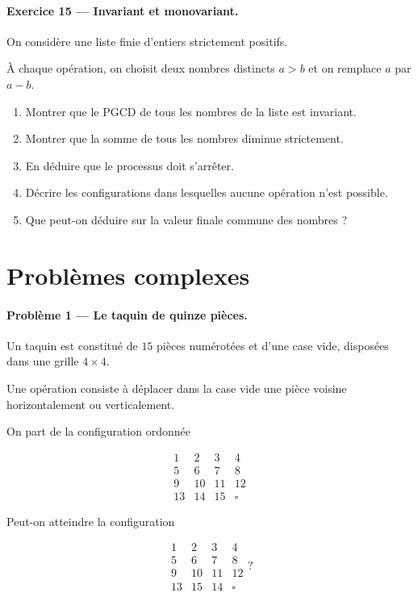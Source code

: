 \paragraph{Exercice 15 --- Invariant et monovariant.}
On considère une liste finie d'entiers strictement positifs.

À chaque opération, on choisit deux nombres distincts \(a>b\) et on remplace
\(a\) par \(a-b\).

\begin{enumerate}
    \item Montrer que le PGCD de tous les nombres de la liste est invariant.
    \item Montrer que la somme de tous les nombres diminue strictement.
    \item En déduire que le processus doit s'arrêter.
    \item Décrire les configurations dans lesquelles aucune opération n'est
    possible.
    \item Que peut-on déduire sur la valeur finale commune des nombres ?
\end{enumerate}

\section{Problèmes complexes}

\paragraph{Problème 1 --- Le taquin de quinze pièces.}
Un taquin est constitué de \(15\) pièces numérotées et d'une case vide,
disposées dans une grille \(4\times4\).

Une opération consiste à déplacer dans la case vide une pièce voisine
horizontalement ou verticalement.

On part de la configuration ordonnée

\[
\begin{matrix}
1&2&3&4\\
5&6&7&8\\
9&10&11&12\\
13&14&15&\square
\end{matrix}
\]

Peut-on atteindre la configuration

\[
\begin{matrix}
1&2&3&4\\
5&6&7&8\\
9&10&11&12\\
13&15&14&\square
\end{matrix}?
\]

